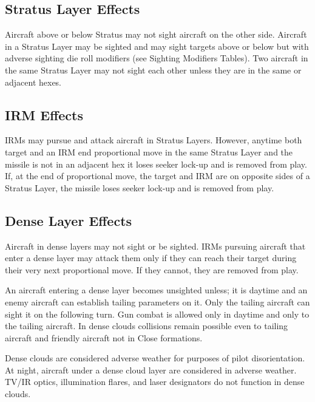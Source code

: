 \begin{advancedrules}
    \subsection{Stratus Layer Effects} Aircraft  above or below Stratus may not sight aircraft  on the other side. Aircraft in a Stratus Layer may be sighted and may sight targets above or below but with adverse sighting die roll modifiers (see Sighting Modifiers Tables). Two aircraft in the same Stratus Layer may not sight each other unless they are in the same or adjacent hexes. 

    \subsection{IRM Effects} IRMs may pursue and attack aircraft in Stratus Layers. However, anytime both target and an IRM end  proportional move in the same Stratus Layer and the missile is not in an adjacent hex it loses seeker lock-up and is removed from play. If, at the end of  proportional move, the target and IRM are on opposite sides of a Stratus Layer, the missile loses seeker lock-up and is removed from play.

    \subsection{Dense Layer Effects} Aircraft in dense layers may not sight or be sighted. IRMs pursuing aircraft that enter a dense layer may attack them only if they can reach their target during their very next proportional move. If they cannot, they are removed from play.

    An aircraft entering a dense layer becomes unsighted unless; it is daytime and an enemy aircraft can establish tailing parameters on it. Only the tailing aircraft can sight it on the following turn. Gun combat is allowed only in daytime and only to the tailing aircraft. In dense clouds collisions remain possible even to tailing aircraft and friendly aircraft not in Close formations.

    Dense clouds are considered adverse weather for purposes of pilot disorientation. At night, aircraft under a dense cloud layer are considered in adverse weather. TV/IR optics, illumination flares, and laser designators do not function in dense clouds.


\end{advancedrules}
